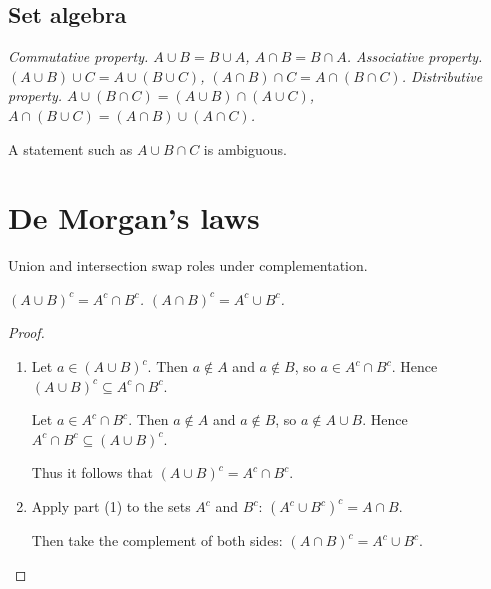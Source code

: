\subsection{Set algebra}
\begin{definition}
\ben
\it Commutative property.
\bit 
\it $A\cup B = B\cup A$,
\it $A\cap B = B\cap A$.
\eit
\it Associative property.
\bit 
\it $(A\cup B)\cup C = A\cup (B\cup C)$,
\it $(A\cap B)\cap C = A\cap (B\cap C)$.
\eit
\it Distributive property.
\bit 
\it $A\cup (B\cap C) = (A\cup B)\cap(A\cup C)$,
\it $A\cap (B\cup C) = (A\cap B)\cup(A\cap C)$.
\eit
\een
\end{definition}

\begin{remark}
A statement such as $A\cup B\cap C$ is ambiguous. 
\end{remark}

\section{De Morgan's laws}
Union and intersection swap roles under complementation.

\begin{theorem}\label{thm:demorgan_simple}
\ben
\it $(A\cup B)^c = A^c\cap B^c$.
\it $(A\cap B)^c = A^c\cup B^c$.
\een
\end{theorem}

\begin{proof}
\begin{enumerate}
\item %
Let $a\in(A\cup B)^c$. Then $a\notin A$ and $a\notin B$, so $a\in A^c\cap B^c$.
Hence $(A\cup B)^c\subseteq A^c\cap B^c$.\par
Let $a\in A^c\cap B^c$. Then $a\notin A$ and $a\notin B$, so $a\notin A\cup B$.
Hence $A^c\cap B^c\subseteq (A\cup B)^c$.\par
Thus it follows that $(A\cup B)^c = A^c\cap B^c$.
\item %
Apply part (1) to the sets $A^c$ and $B^c$: $(A^c\cup B^c)^c = A\cap B$.\par
Then take the complement of both sides: $(A\cap B)^c = A^c\cup B^c$.
\end{enumerate}
\end{proof}

